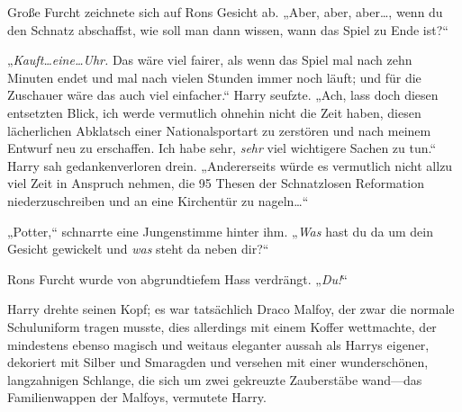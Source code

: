 Große Furcht zeichnete sich auf Rons Gesicht ab. „Aber, aber, aber…, wenn du den Schnatz abschaffst, wie soll man dann wissen, wann das Spiel zu Ende ist?“

„\emph{Kauft…eine…Uhr.} Das wäre viel fairer, als wenn das Spiel mal nach zehn Minuten endet und mal nach vielen Stunden immer noch läuft; und für die Zuschauer wäre das auch viel einfacher.“ Harry seufzte. „Ach, lass doch diesen entsetzten Blick, ich werde vermutlich ohnehin nicht die Zeit haben, diesen lächerlichen Abklatsch einer Nationalsportart zu zerstören und nach meinem Entwurf neu zu erschaffen. Ich habe sehr, \emph{sehr} viel wichtigere Sachen zu tun.“ Harry sah gedankenverloren drein. „Andererseits würde es vermutlich nicht allzu viel Zeit in Anspruch nehmen, die 95 Thesen der Schnatzlosen Reformation niederzuschreiben und an eine Kirchentür zu nageln…“

„Potter,“ schnarrte eine Jungenstimme hinter ihm. „\emph{Was} hast du da um dein Gesicht gewickelt und \emph{was} steht da neben dir?“

Rons Furcht wurde von abgrundtiefem Hass verdrängt. „\emph{Du!}“

Harry drehte seinen Kopf; es war tatsächlich Draco Malfoy, der zwar die normale Schuluniform tragen musste, dies allerdings mit einem Koffer wettmachte, der mindestens ebenso magisch und weitaus eleganter aussah als Harrys eigener, dekoriert mit Silber und Smaragden und versehen mit einer wunderschönen, langzahnigen Schlange, die sich um zwei gekreuzte Zauberstäbe wand—das Familienwappen der Malfoys, vermutete Harry.

